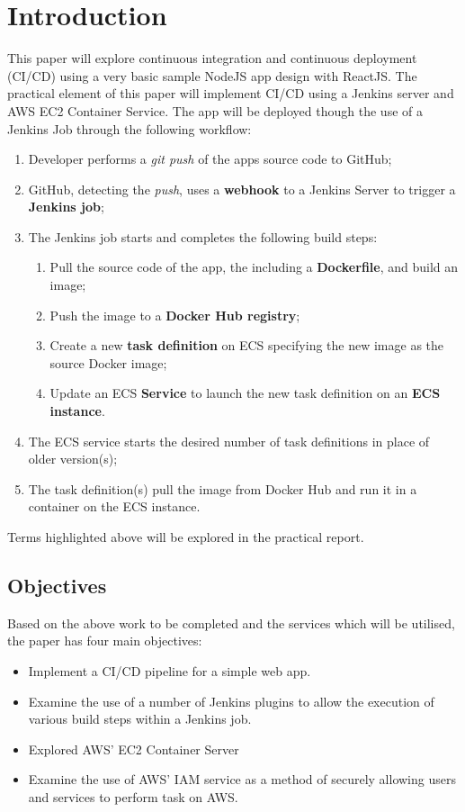 \section{Introduction}
This paper will explore continuous integration and continuous deployment (CI/CD) using a very basic sample NodeJS app design with ReactJS. The practical element of this paper will implement CI/CD using a Jenkins server and AWS EC2 Container Service. The app will be deployed though the use of a Jenkins Job through the following workflow:

\begin{enumerate}
	\item Developer performs a \textit{git push} of the apps source code to GitHub;
	\item GitHub, detecting the \textit{push}, uses a \textbf{webhook} to a Jenkins Server to trigger a \textbf{Jenkins job};
	\item The Jenkins job starts and completes the following build steps:
	\begin{enumerate}
		\item Pull the source code of the app, the including a \textbf{Dockerfile}, and build an image;
		\item Push the image to a \textbf{Docker Hub registry};
		\item Create a new \textbf{task definition} on ECS specifying the new image as the source Docker image;
		\item Update an ECS \textbf{Service} to launch the new task definition on an \textbf{ECS instance}.
	\end{enumerate}
	\item The ECS service starts the desired number of task definitions in place of older version(s);
	\item The task definition(s) pull the image from Docker Hub and run it in a container on the ECS instance.
\end{enumerate}
Terms highlighted above will be explored in the practical report.

\subsection{Objectives}
Based on the above work to be completed and the services which will be utilised, the paper has four main objectives:
\begin{itemize}
	\item Implement a CI/CD pipeline for a simple web app.
	\item Examine the use of a number of Jenkins plugins to allow the execution of various build steps within a Jenkins job.
	\item Explored AWS'  EC2 Container Server
	\item Examine the use of AWS' IAM service as a method of securely allowing users and services to perform task on AWS.
\end{itemize}